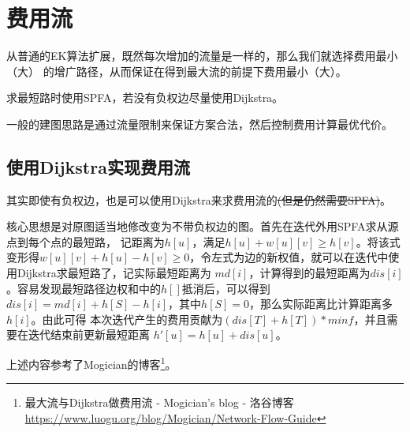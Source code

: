 \section{费用流}
从普通的EK算法扩展，既然每次增加的流量是一样的，那么我们就选择费用最小（大）
的增广路径，从而保证在得到最大流的前提下费用最小（大）。

求最短路时使用SPFA，若没有负权边尽量使用Dijkstra。

一般的建图思路是通过流量限制来保证方案合法，然后控制费用计算最优代价。

\subsection{使用Dijkstra实现费用流}
其实即使有负权边，也是可以使用Dijkstra来求费用流的\sout{(但是仍然需要SPFA)}。

核心思想是对原图适当地修改变为不带负权边的图。首先在迭代外用SPFA求从源点到每个点的最短路，
记距离为$h[u]$，满足$h[u]+w[u][v]\geq h[v]$。将该式变形得$w[u][v]+h[u]-h[v]
\geq 0$，令左式为边的新权值，就可以在迭代中使用Dijkstra求最短路了，记实际最短距离为
$md[i]$，计算得到的最短距离为$dis[i]$。容易发现最短路径边权和中的$h[]$抵消后，可以得到
$dis[i]=md[i]+h[S]-h[i]$，其中$h[S]=0$，那么实际距离比计算距离多$h[i]$。由此可得
本次迭代产生的费用贡献为$(dis[T]+h[T])*minf$，并且需要在迭代结束前更新最短距离
$h'[u]=h[u]+dis[u]$。

上述内容参考了Mogician的博客\footnote{
    最大流与Dijkstra做费用流 - Mogician's blog - 洛谷博客
    \url{https://www.luogu.org/blog/Mogician/Network-Flow-Guide}}。
